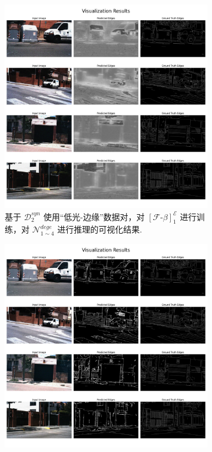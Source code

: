 \documentclass[a4paper]{ctexart}
\begin{document}
		\begin{figure}[htbp]
			\centering
			\begin{subfigure}{0.45\textwidth}
				\includegraphics[width=\linewidth]{picture/Edge Detection/LLtoEdge(straight)}
				\captionsetup{font=scriptsize}
				\caption{基于 $\mathcal{D}^{syn}_{2}$ 使用“低光-边缘”数据对，对 ${\left[\mathcal{F}\text{-}\beta\right]}^{\mathcal{E}}_1$ 进行训练，对 $\mathcal{N}_{1 \sim 4}^{dege}$ 进行推理的可视化结果.}
				\label{fig: LLtoEdge(straight)}
			\end{subfigure}
			\begin{subfigure}{0.45\textwidth}
				\includegraphics[width=\linewidth]{picture/Edge Detection/LLtoEdge(trainbasenormal)}

\end{subfigure}
\end{figure}
\end{document}
